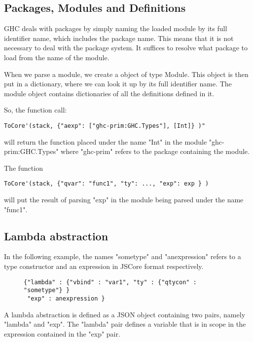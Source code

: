 \subsection*{Packages, Modules and Definitions}

GHC deals with packages by simply naming the loaded module by its full identifier
name, which includes the package name. This means that it is not necessary to deal
with the package system. It suffices to resolve what package to load from the name
of the module.

When we parse a module, we create a object of type Module. This object is
then put in a dictionary, where we can look it up by its full identifier name.
The module object contains dictionaries of all the definitions defined in it.

So, the function call:
\lstset{ %
language=Haskell,
label=lst:int1
}
\begin{lstlisting}
ToCore'(stack, {"aexp": ["ghc-prim:GHC.Types"], [Int]} )" 
\end{lstlisting}

will return the function placed under the name "Int" in the module "ghc-prim:GHC.Types" 
where "ghc-prim" refers to the package containing the module. 

The function 
\lstset{ %
language=Haskell,
label=lst:int1
}
\begin{lstlisting}
ToCore'(stack, {"qvar": "func1", "ty": ..., "exp": exp } )
\end{lstlisting}
will
put the result of parsing "exp" in the module being parsed under the name "func1".

\subsection*{Lambda abstraction}

In the following example, the names "sometype" and "anexpression" refers to a 
type constructor and an expression in JSCore format respectively.

\begin{figure}[H]
\lstset{ %
language=Haskell,
caption=Python class implementing the Haskell Int Value.,
label=lst:int1
}
\begin{lstlisting}
{"lambda" : {"vbind" : "var1", "ty" : {"qtycon" : "sometype"} }
 "exp" : anexpression }
\end{lstlisting}
\end{figure}

A lambda abstraction is defined as a JSON object containing two pairs, namely 
"lambda" and "exp". The "lambda" pair defines a variable that is in scope in the
expression contained in the "exp" pair.


